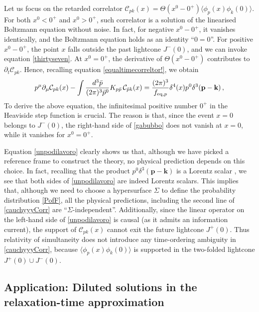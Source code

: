 \documentclass[aps,prd,preprint,nofootinbib,amsmath,amssymb,showpacs,longbibliography,singlecolumn,superscriptaddress,10pt]{revtex4-1}
\theoremstyle{plain}
\theoremstyle{definition}
\begin{document}
Let us focus on the retarded correlator $\mathcal{C}_{pk}(x)=\Theta(x^0-0^+)\langle \phi_p(x)\phi_k(0)\rangle$. For both $x^0<0^+$ and $x^0>0^+$, such correlator is a solution of the linearised Boltzmann equation without noise. In fact, for negative $x^0-0^+$, it vanishes identically, and the Boltzmann equation holds as an identity ``$0=0$''. For positive $x^0-0^+$, the point $x$ falls outside the past lightcone $J^-(0)$, and we can invoke equation \eqref{thirtyseven}. At $x^0=0^+$, the derivative of $\Theta(x^0-0^+)$ contributes to $\partial_t \mathcal{C}_{pk}$. Hence, recalling equation \eqref{equaltimecorreltor!}, we obtain
\begin{equation}\label{unpodilavoro}
    p^\mu \partial_\mu \mathcal{C}_{pk}(x)-\int \dfrac{d^3 \Bar{p}}{(2\pi)^3 \Bar{p}^0} K_{p\Bar{p}} \,  \mathcal{C}_{\Bar{p}k}(x)= \dfrac{(2\pi)^3}{f_{\text{eq},p}} \delta^4(x) p^0 \delta^3(\textbf{p}-\textbf{k}) \, ,
\end{equation}
To derive the above equation, the infinitesimal positive number $0^+$ in the Heaviside step function is crucial. The reason is that, since the event $x=0$ belongs to $J^-(0)$, the right-hand side of \eqref{gabubbo} does not vanish at $x=0$, while it vanishes for $x^0=0^+$. 

Equation \eqref{unpodilavoro} clearly shows us that, although we have picked a reference frame to construct the theory, no physical prediction depends on this choice. In fact, recalling that the product $p^0 \delta^3(\textbf{p}-\textbf{k})$ is a Lorentz scalar \cite{Peskin_book}, we see that both sides of \eqref{unpodilavoro} are indeed Lorentz scalars. This implies that, although we need to choose a hypersurface $\Sigma$ to define the probability distribution \eqref{PofF}, all the physical predictions, including the second line of \eqref{cauchyyyCorr} are ``$\Sigma$-independent''. Additionally, since the linear operator on the left-hand side of \eqref{unpodilavoro} is causal (as it admits an information current), the support of $\mathcal{C}_{pk}(x)$ cannot exit the future lightcone $J^+(0)$. Thus relativity of simultaneity does not introduce any time-ordering ambiguity in \eqref{cauchyyyCorr}, because $\langle \phi_p(x)\phi_k(0) \rangle$ is supported in the two-folded lightcone $J^+(0)\cup J^-(0)$.

\subsection{Application: Diluted solutions in the relaxation-time approximation}\label{diluzzio}
\end{document}

